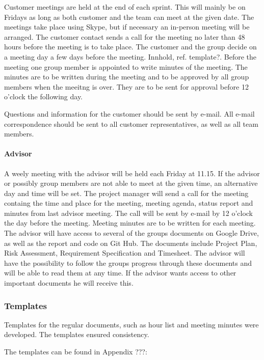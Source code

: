 Customer meetings are held at the end of each sprint. This will mainly be on Fridays as long as both customer and the team can meet at the given date. The meetings take place using Skype, but if necessary an in-person meeting will be arranged. The customer contact sends a call for the meeting no later than 48 hours before the meeting is to take place. The customer and the group decide on a meeting day a few days before the meeting. Innhold, ref. template?. Before the meeting one group member is appointed to write minutes of the meeting. The minutes are to be written during the meeting and to be approved by all group members when the meeitng is over. They are to be sent for approval before 12 o'clock the following day. 

Questions and information for the customer should be sent by e-mail. All e-mail correspondence should be sent to all customer representatives, as well as all team members.


\paragraph{Advisor}

A weely meeting with the advisor will be held each Friday at 11.15. If the advisor or possibly group members are not able to meet at the given time, an alternative day and time will be set. The project manager will send a call for the meeting containg the time and place for the meeting, meeting agenda, status report and minutes from last advisor meeting. The call will be sent by e-mail by 12 o'clock the day before the meeting. Meeting minutes are to be written for each meeting. The advisor will have access to several of the groups documents on Google Drive, as well as the report and code on Git Hub. The documents include Project Plan, Risk Assessment, Requirement Specification and Timesheet. The advisor will have the possibility to follow the groups progress through these documents and will be able to read them at any time. If the advisor wants access to other important documents he will receive this. 

\subsubsection{Templates}

Templates for the regular documents, such as hour list and meeting minutes were developed. The templates ensured consistency.

The templates can be found in Appendix ???:

